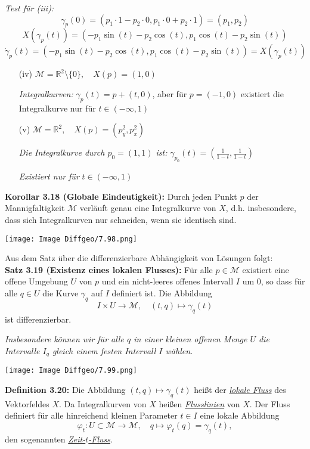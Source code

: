 \documentclass[fleqn, 12pt, letterpaper]{article}
\begin{document}
\textit{Test für (iii):}  
\[
\gamma_p(0) = \left( p_1\cdot1-p_2\cdot0, p_1\cdot0+p_2\cdot1 \right) = (p_1, p_2)
\]
\[
X(\gamma_p(t)) = \left( -p_1\sin(t)-p_2\cos(t), p_1\cos(t)-p_2\sin(t) \right)
\]
\[
\dot{\gamma}_p(t) = \left( -p_1\sin(t)-p_2\cos(t), p_1\cos(t)-p_2\sin(t) \right) = X(\gamma_p(t))
\]

\begin{itemize}
  \item[(iv)] \(\mathcal{M} = \mathbb{R}^2 \setminus \{0\}, \quad X(p) = (1,0)\)

  \textit{Integralkurven:} \(\gamma_p(t) = p + (t, 0)\), aber für \(p = (-1,0)\) existiert die Integralkurve nur für \(t \in (-\infty,1)\)

  \item[(v)] \(\mathcal{M} = \mathbb{R}^2, \quad X(p) = (p_y^2, p_x^2)\)

  \textit{Die Integralkurve durch \(p_0 = (1,1)\) ist:} \(\gamma_{p_0}(t) = \left( \frac{1}{1-t}, \frac{1}{1-t} \right)\)

  \textit{Existiert nur für } \(t \in (-\infty, 1)\)
\end{itemize}


\textbf{Korollar 3.18 (Globale Eindeutigkeit):}  
Durch jeden Punkt \(p\) der Mannigfaltigkeit \(\mathcal{M}\) verläuft genau eine Integralkurve von \(X\), d.h. insbesondere, dass sich Integralkurven nur schneiden, wenn sie identisch sind.

\texttt{[image: Image Diffgeo/7.98.png]}

Aus dem Satz über die differenzierbare Abhängigkeit von Lösungen folgt:\\

\textbf{Satz 3.19 (Existenz eines lokalen Flusses):}  
Für alle \(p \in \mathcal{M}\) existiert eine offene Umgebung \(U\) von \(p\) und ein nicht-leeres offenes Intervall \(I\) um \(0\), so dass für alle \(q \in U\) die Kurve \(\gamma_q\) auf \(I\) definiert ist.  
Die Abbildung
\[
I \times U \longrightarrow \mathcal{M}, \quad (t, q) \longmapsto \gamma_q(t)
\]
ist differenzierbar.

\textit{Insbesondere können wir für alle \(q\) in einer kleinen offenen Menge \(U\) die Intervalle \(I_q\) gleich einem festen Intervall \(I\) wählen.}

\texttt{[image: Image Diffgeo/7.99.png]}

\textbf{Definition 3.20:}  
Die Abbildung \((t, q) \mapsto \gamma_q(t)\) heißt der \underline{\emph{lokale Fluss}} des Vektorfeldes \(X\).  
Da Integralkurven von \(X\) heißen \underline{\emph{Flusslinien}} von \(X\). Der Fluss definiert für alle hinreichend kleinen Parameter \(t \in I\) eine lokale Abbildung
\[
\varphi_t: U \subset \mathcal{M} \to \mathcal{M}, \quad q \mapsto \varphi_t(q)=\gamma_q(t),
\]
den sogenannten \underline{\emph{Zeit-\(t\)-Fluss}}.
\end{document}
